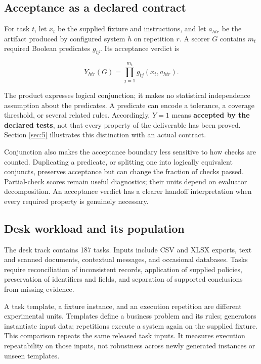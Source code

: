 \subsection{Acceptance as a declared contract}\label{acceptance-as-a-declared-contract}

For task \(t\), let \(x_t\) be the supplied fixture and instructions, and let \(a_{htr}\) be the artifact produced by configured system \(h\) on repetition \(r\). A scorer \(G\) contains \(m_t\) required Boolean predicates \(g_{tj}\). Its acceptance verdict is

\[
Y_{htr}(G)=\prod_{j=1}^{m_t}g_{tj}(x_t,a_{htr}).
\]

The product expresses logical conjunction; it makes no statistical independence assumption about the predicates. A predicate can encode a tolerance, a coverage threshold, or several related rules. Accordingly, \(Y=1\) means \textbf{accepted by the declared tests}, not that every property of the deliverable has been proved. Section \ref{sec:5} illustrates this distinction with an actual contract.

Conjunction also makes the acceptance boundary less sensitive to how checks are counted. Duplicating a predicate, or splitting one into logically equivalent conjuncts, preserves acceptance but can change the fraction of checks passed. Partial-check scores remain useful diagnostics; their units depend on evaluator decomposition. An acceptance verdict has a clearer handoff interpretation when every required property is genuinely necessary.

\subsection{Desk workload and its population}\label{desk-workload-and-its-population}

The desk track contains 187 tasks. Inputs include CSV and XLSX exports, text and scanned documents, contextual messages, and occasional databases. Tasks require reconciliation of inconsistent records, application of supplied policies, preservation of identifiers and fields, and separation of supported conclusions from missing evidence.



A task template, a fixture instance, and an execution repetition are different experimental units. Templates define a business problem and its rules; generators instantiate input data; repetitions execute a system again on the supplied fixture. This comparison repeats the same released task inputs. It measures execution repeatability on those inputs, not robustness across newly generated instances or unseen templates.

